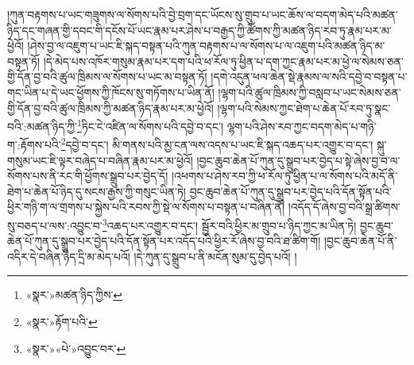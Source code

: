 །ཀུན་བརྟགས་པ་ཡང་གཟུགས་ལ་སོགས་པའི་བྱེ་བྲག་དང་ཡོངས་སུ་གྲུབ་པ་ཡང་ཆོས་ལ་བདག་མེད་པའི་མཚན་ཉིད་དང་གཞན་གྱི་དབང་གི་དངོས་པོ་ཡང་རྣམ་པར་ཤེས་པ་བརྒྱད་ཀྱི་ཚོགས་ཀྱི་མཚན་ཉིད་རབ་ཏུ་རྣམ་པར་མ་ཕྱེའོ། །ཤེས་བྱ་ལ་འཇུག་པ་ཡང་ཇི་སྐད་བསྟན་པའི་ཀུན་བརྟགས་པ་ལ་སོགས་པ་ལ་འཇུག་པའི་མཚན་ཉིད་མ་བསྟན་ཏོ། །དེ་མེད་པས་འཁོར་གསུམ་རྣམ་པར་དག་པའི་ཕ་རོལ་ཏུ་ཕྱིན་པ་དག་ཀྱང་རྣམ་པར་མ་ཕྱེ་ལ་སེམས་ཅན་གྱི་དོན་བྱ་བའི་ཚུལ་ཁྲིམས་ལ་སོགས་པ་ཡང་མ་བསྟན་ཏོ། །དགེ་འདུན་ཕལ་ཆེན་སྡེ་རྣམས་ལ་སའི་དབྱེ་བ་བསྟན་པ་གང་ཡིན་པ་དེ་ཡང་ཕྱོགས་ཀྱི་ཁོངས་སུ་གཏོགས་པ་ཡིན་ནོ། །ལྷག་པའི་ཚུལ་ཁྲིམས་ཀྱི་བསླབ་པ་ཡང་སེམས་ཅན་གྱི་དོན་བྱ་བའི་ཚུལ་ཁྲིམས་ཀྱི་མཚན་ཉིད་རྣམ་པར་མ་ཕྱེའོ། །ལྷག་པའི་སེམས་ཀྱང་ཐེག་པ་ཆེན་པོ་རབ་ཏུ་སྣང་བའི་:མཚན་ཉིད་ཀྱི་\footnote{«སྣར་»མཚན་ཉིད་ཀྱིས་}ཏིང་ངེ་འཛིན་ལ་སོགས་པའི་དབྱེ་བ་དང་། ལྷག་པའི་ཤེས་རབ་ཀྱང་བདག་མེད་པ་གཉི་ག་:རྟོགས་པའི་\footnote{«སྣར་»རྟོག་པའི་}དབྱེ་བ་དང་། མི་གནས་པའི་མྱ་ངན་ལས་འདས་པ་ཡང་ཇི་སྐད་འཆད་པར་འགྱུར་བ་དང་། སྐུ་གསུམ་ཡང་ཇི་ལྟར་བཞེད་པ་བཞིན་རྣམ་པར་མ་ཕྱེའོ། །བྱང་ཆུབ་ཆེན་པོ་ཀུན་དུ་སྒྲུབ་པར་བྱེད་པ་སྟེ་ཞེས་བྱ་བ་ལ་སོགས་པས་ནི་རང་གི་ཕྱོགས་སྒྲུབ་པར་བྱེད་དོ། །འཕགས་པ་ཤེས་རབ་ཀྱི་ཕ་རོལ་ཏུ་ཕྱིན་པ་ལ་སོགས་པའི་མདོ་ནི་ཐེག་པ་ཆེན་པོ་ཉིད་དུ་སངས་རྒྱས་ཀྱི་གསུང་ཡིན་ཏེ། བྱང་ཆུབ་ཆེན་པོ་ཀུན་དུ་སྒྲུབ་པར་བྱེད་པའི་དོན་སྟོན་པའི་ཕྱིར་གཉི་ག་ལ་གྲགས་པ་སྐྱེས་པའི་རབས་ཀྱི་སྡེ་ལ་སོགས་པ་བསྟན་པ་བཞིན་ནོ། །འདོད་དོ་ཞེས་བྱ་བའི་སྒྲ་ཚིགས་སུ་བཅད་པ་ལས་:འབྱུང་བ་\footnote{«སྣར་»«པེ་»འབྱུང་བར་}འཆད་པར་འགྱུར་བ་དང་། སྦྱོར་བའི་ཕྱིར་མ་གྲུབ་པ་ཉིད་ཀྱང་མ་ཡིན་ཏེ། བྱང་ཆུབ་ཆེན་པོ་ཀུན་དུ་སྒྲུབ་པར་བྱེད་པའི་དོན་སྟོན་པར་འདོད་པའི་ཕྱིར་རོ་ཞེས་བྱ་བའི་ཐ་ཚིག་གོ། །བྱང་ཆུབ་ཆེན་པོ་ནི་འདིར་དེ་བཞིན་ཉིད་དྲི་མ་མེད་པའོ། །དེ་ཀུན་དུ་སྒྲུབ་པ་ནི་མངོན་སུམ་དུ་བྱེད་པའོ། །
